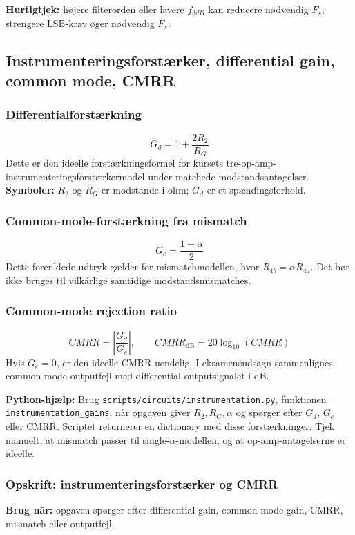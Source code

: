 \textbf{Hurtigtjek:} højere filterorden eller lavere \(f_{3dB}\) kan reducere nødvendig \(F_s\); strengere LSB-krav øger nødvendig \(F_s\).

\subsection{Instrumenteringsforstærker, differential gain, common mode, CMRR}

\subsubsection{Differentialforstærkning}
\[
G_d=1+\frac{2R_2}{R_G}
\]
Dette er den ideelle forstærkningsformel for kursets tre-op-amp-instrumenteringsforstærkermodel under matchede modstandsantagelser.
\textbf{Symboler:} \(R_2\) og \(R_G\) er modstande i ohm; \(G_d\) er et spændingsforhold.

\subsubsection{Common-mode-forstærkning fra mismatch}
\[
G_c=\frac{1-\alpha}{2}
\]
Dette forenklede udtryk gælder for mismatchmodellen, hvor \(R_{4b}=\alpha R_{4a}\). Det bør ikke bruges til vilkårlige samtidige modstandsmismatches.

\subsubsection{Common-mode rejection ratio}
\[
CMRR=\left|\frac{G_d}{G_c}\right|,\qquad
CMRR_{\mathrm{dB}}=20\log_{10}(CMRR)
\]
Hvis \(G_c=0\), er den ideelle CMRR uendelig. I eksamensudsagn sammenlignes common-mode-outputfejl med differential-outputsignalet i dB.

\textbf{Python-hjælp:} Brug \texttt{scripts/circuits/instrumentation.py}, funktionen \texttt{instrumentation\_gains}, når opgaven giver \(R_2,R_G,\alpha\) og spørger efter \(G_d\), \(G_c\) eller CMRR. Scriptet returnerer en dictionary med disse forstærkninger. Tjek manuelt, at mismatch passer til single-\(\alpha\)-modellen, og at op-amp-antagelserne er ideelle.

\subsubsection{Opskrift: instrumenteringsforstærker og CMRR}
\textbf{Brug når:} opgaven spørger efter differential gain, common-mode gain, CMRR, mismatch eller outputfejl.

